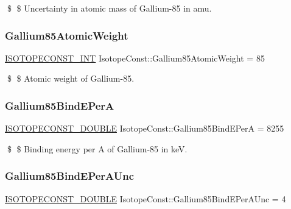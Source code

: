 \$ \$ Uncertainty in atomic mass of Gallium-\/85 in amu. \mbox{\label{group___isotope_const-_gallium-_ga85_ga41759fe4517e8c01dc824dfd9140ac37}} 
\subsubsection{\texorpdfstring{Gallium85\+Atomic\+Weight}{Gallium85AtomicWeight}}
{\footnotesize\ttfamily \mbox{\hyperlink{group___isotope_const-_macros_ga5f18360b3e99483a35c32d789e62621c}{I\+S\+O\+T\+O\+P\+E\+C\+O\+N\+S\+T\+\_\+\+I\+NT}} Isotope\+Const\+::\+Gallium85\+Atomic\+Weight = 85}

\$ \$ Atomic weight of Gallium-\/85. \mbox{\label{group___isotope_const-_gallium-_ga85_ga7e5bc646ce6095838f26c19aea238024}} 
\subsubsection{\texorpdfstring{Gallium85\+Bind\+E\+PerA}{Gallium85BindEPerA}}
{\footnotesize\ttfamily \mbox{\hyperlink{group___isotope_const-_macros_ga8f45a7272ce02c0b4c65c44636ed719a}{I\+S\+O\+T\+O\+P\+E\+C\+O\+N\+S\+T\+\_\+\+D\+O\+U\+B\+LE}} Isotope\+Const\+::\+Gallium85\+Bind\+E\+PerA = 8255}

\$ \$ Binding energy per A of Gallium-\/85 in keV. \mbox{\label{group___isotope_const-_gallium-_ga85_gab64ed017bd82806587b2ba9c89787069}} 
\subsubsection{\texorpdfstring{Gallium85\+Bind\+E\+Per\+A\+Unc}{Gallium85BindEPerAUnc}}
{\footnotesize\ttfamily \mbox{\hyperlink{group___isotope_const-_macros_ga8f45a7272ce02c0b4c65c44636ed719a}{I\+S\+O\+T\+O\+P\+E\+C\+O\+N\+S\+T\+\_\+\+D\+O\+U\+B\+LE}} Isotope\+Const\+::\+Gallium85\+Bind\+E\+Per\+A\+Unc = 4}

